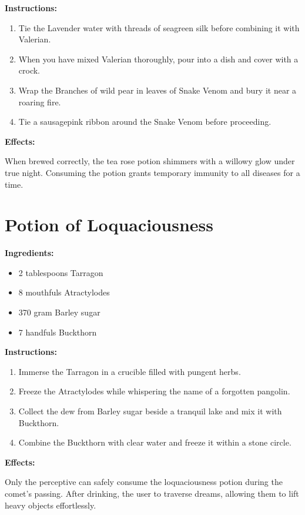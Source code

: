 \documentclass{article}
\begin{document}
\textbf{Instructions:}

\begin{enumerate}
  \item Tie the Lavender water with threads of seagreen silk before combining it with Valerian.
  \item When you have mixed Valerian thoroughly, pour into a dish and cover with a crock.
  \item Wrap the Branches of wild pear in leaves of Snake Venom and bury it near a roaring fire.
  \item Tie a sausagepink ribbon around the Snake Venom before proceeding.
\end{enumerate}

\textbf{Effects:}

When brewed correctly, the tea rose potion shimmers with a willowy glow under true night. Consuming the potion grants temporary immunity to all diseases for a time.

\newpage
\section*{Potion of Loquaciousness}

\textbf{Ingredients:}

\begin{itemize}
  \item 2 tablespoons Tarragon
  \item 8 mouthfuls Atractylodes
  \item 370 gram Barley sugar
  \item 7 handfuls Buckthorn
\end{itemize}

\textbf{Instructions:}

\begin{enumerate}
  \item Immerse the Tarragon in a crucible filled with pungent herbs.
  \item Freeze the Atractylodes while whispering the name of a forgotten pangolin.
  \item Collect the dew from Barley sugar beside a tranquil lake and mix it with Buckthorn.
  \item Combine the Buckthorn with clear water and freeze it within a stone circle.
\end{enumerate}

\textbf{Effects:}

Only the perceptive can safely consume the loquaciousness potion during the comet’s passing. After drinking, the user to traverse dreams, allowing them to lift heavy objects effortlessly.
\end{document}

